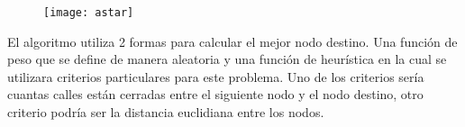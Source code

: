 \documentclass{article}
\begin{document}
\begin{figure}[ht]
    \texttt{[image: astar]}
    \centering
\end{figure}

El algoritmo utiliza 2 formas para calcular el mejor nodo destino. Una función
de peso que se define de manera aleatoria y una función de heurística en la cual
se utilizara criterios particulares para este problema. Uno de los criterios sería
cuantas calles están cerradas entre el siguiente nodo y el nodo destino, otro criterio
podría ser la distancia euclidiana entre los nodos.

\printbibliography{}
\end{document}
